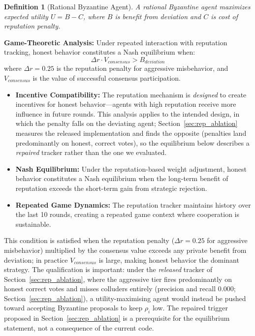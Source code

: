 \documentclass{article}
\newtheorem{definition}{Definition}[section]
\begin{document}
\begin{definition}[Rational Byzantine Agent]
A rational Byzantine agent maximizes expected utility $U = B - C$, where $B$ is benefit from deviation and $C$ is cost of reputation penalty.
\end{definition}

\textbf{Game-Theoretic Analysis:} Under repeated interaction with reputation tracking, honest behavior constitutes a Nash equilibrium when:
\begin{equation}
    \Delta r \cdot V_{consensus} > B_{deviation}
\end{equation}
where $\Delta r = 0.25$ is the reputation penalty for aggressive misbehavior, and $V_{consensus}$ is the value of successful consensus participation.

\begin{itemize}
    \item \textbf{Incentive Compatibility:} The reputation mechanism is \emph{designed} to create incentives for honest behavior---agents with high reputation receive more influence in future rounds. This analysis applies to the intended design, in which the penalty falls on the deviating agent; Section~\ref{sec:rep_ablation} measures the released implementation and finds the opposite (penalties land predominantly on honest, correct votes), so the equilibrium below describes a \emph{repaired} tracker rather than the one we evaluated.
    \item \textbf{Nash Equilibrium:} Under the reputation-based weight adjustment, honest behavior constitutes a Nash equilibrium when the long-term benefit of reputation exceeds the short-term gain from strategic rejection.
    \item \textbf{Repeated Game Dynamics:} The reputation tracker maintains history over the last 10 rounds, creating a repeated game context where cooperation is sustainable.
\end{itemize}

This condition is satisfied when the reputation penalty ($\Delta r = 0.25$ for aggressive misbehavior) multiplied by the consensus value exceeds any private benefit from deviation; in practice $V_{consensus}$ is large, making honest behavior the dominant strategy. The qualification is important: under the \emph{released} tracker of Section~\ref{sec:rep_ablation}, where the aggressive tier fires predominantly on honest correct votes and misses colluders entirely (precision and recall $0.000$; Section~\ref{sec:rep_ablation}), a utility-maximising agent would instead be pushed toward accepting Byzantine proposals to keep $\rho_i$ low. The repaired trigger proposed in Section~\ref{sec:rep_ablation} is a prerequisite for the equilibrium statement, not a consequence of the current code.
\end{document}
